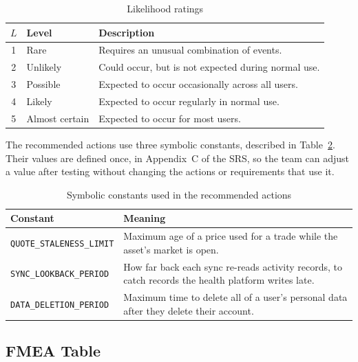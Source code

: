 \documentclass{article}
\begin{document}
\begin{table}[H]
  \caption{Likelihood ratings} \label{TblLikelihood}
  \small
  \begin{tabularx}{\textwidth}{clX}
    \toprule
    \textbf{$L$} & \textbf{Level} & \textbf{Description}                                \\
    \midrule
    1            & Rare           & Requires an unusual combination of events.          \\
    2            & Unlikely       & Could occur, but is not expected during normal use. \\
    3            & Possible       & Expected to occur occasionally across all users.    \\
    4            & Likely         & Expected to occur regularly in normal use.          \\
    5            & Almost certain & Expected to occur for most users.                   \\
    \bottomrule
  \end{tabularx}
\end{table}

The recommended actions use three symbolic constants, described in
Table~\ref{TblConstants}. Their values are defined once, in Appendix~C of the
SRS, so the team can adjust a value after testing without changing the actions
or requirements that use it.

\begin{table}[H]
  \caption{Symbolic constants used in the recommended actions}
  \label{TblConstants}
  \small
  \begin{tabularx}{\textwidth}{lX}
    \toprule
    \textbf{Constant} & \textbf{Meaning}\\
    \midrule
    \texttt{QUOTE\_STALENESS\_LIMIT} & Maximum age of a price used for a trade
    while the asset's market is open.\\
    \texttt{SYNC\_LOOKBACK\_PERIOD} & How far back each sync re-reads activity
    records, to catch records the health platform writes late.\\
    \texttt{DATA\_DELETION\_PERIOD} & Maximum time to delete all of a user's
    personal data after they delete their account.\\
    \bottomrule
  \end{tabularx}
\end{table}


\subsection{FMEA Table} \label{SecFMEATable}
\end{document}
